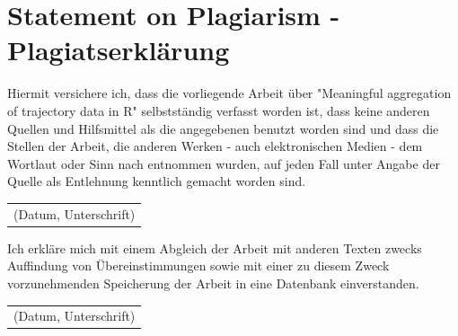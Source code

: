 \documentclass[12pt, oneside, a4paper]{scrbook}
\begin{document}
\backmatter



%





\chapter*{Statement on Plagiarism - Plagiatserkl\"arung}




Hiermit versichere ich, dass die vorliegende Arbeit \"uber "Meaningful aggregation of trajectory data in R" selbstst\"andig verfasst worden ist, dass keine anderen Quellen und Hilfsmittel als die angegebenen benutzt worden sind und dass die Stellen der Arbeit, die anderen Werken - auch elektronischen Medien - dem Wortlaut oder Sinn nach entnommen wurden, auf jeden Fall unter Angabe der Quelle als Entlehnung kenntlich gemacht worden sind.

\vspace{48pt}

\begin{tabular}{@{}l@{}}\hline
(Datum, Unterschrift)
\end{tabular}

\vspace{48pt}

Ich erkl\"are mich mit einem Abgleich der Arbeit mit anderen Texten zwecks Auffindung von \"Ubereinstimmungen sowie mit einer zu diesem Zweck vorzunehmenden Speicherung der Arbeit in eine Datenbank einverstanden.

\vspace{48pt}

\begin{tabular}{@{}l@{}}\hline
(Datum, Unterschrift)
\end{tabular}

\end{document}
